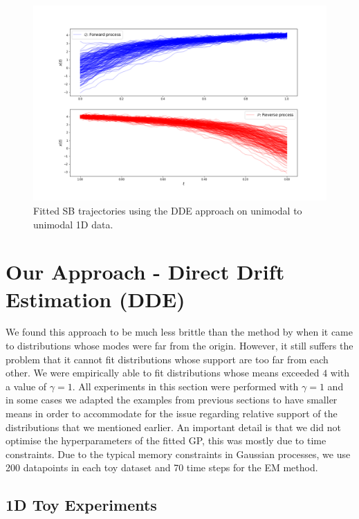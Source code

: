 \documentclass[a4paper,12pt,twoside,openright]{report}
\theoremstyle{definition}
\begin{document}
\begin{figure}[t]
    \centering
    \includegraphics[scale=0.4,trim={2.3cm 1cm 2.5cm 0}, clip]{images/GP/gp_bigvar_trajectories.png}
    \caption{ Fitted SB trajectories using the DDE approach on unimodal to unimodal 1D data.  }
    \label{fig:bigvar200trajectroies}
\end{figure}
\section{Our Approach - Direct Drift Estimation (DDE)}

We found this approach to be much less brittle than the method by \cite{pavon2018data} when it came to distributions whose modes were far from the origin. However, it still suffers the problem that it cannot fit distributions whose support are too far from each other. We were empirically able to fit distributions whose means exceeded $4$ with a value of $\gamma=1$. All experiments in this section were performed with $\gamma=1$ and in some cases we adapted the examples from previous sections to have smaller means in order to accommodate for the issue regarding relative support of the distributions that we mentioned earlier. An important detail is that we did not optimise the hyperparameters of the fitted GP, this was mostly due to time constraints. Due to the typical memory constraints in Gaussian processes, we use 200 datapoints in each toy dataset and 70 time steps for the EM method.

\subsection{1D Toy Experiments }
\end{document}
